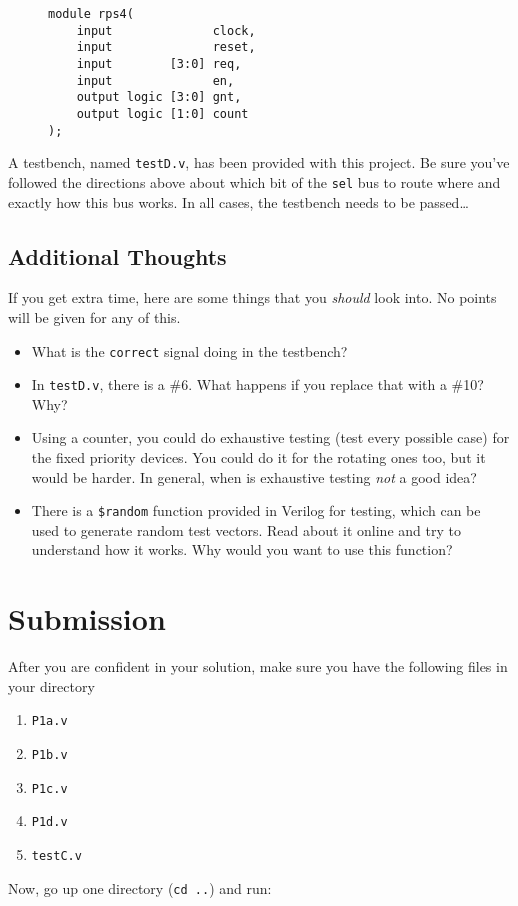 \documentclass{article}
\begin{document}
\begin{figure}[H]
\begin{verbatim}
module rps4(
	input              clock,
	input              reset,
	input        [3:0] req,
	input              en,
	output logic [3:0] gnt,
	output logic [1:0] count
);
\end{verbatim}
\end{figure}

A testbench, named \texttt{testD.v}, has been provided with this project. Be
sure you've followed the directions above about which bit of the \texttt{sel}
bus to route where and exactly how this bus works. In all cases, the testbench
needs to be passed\dots

\subsection{Additional Thoughts}
If you get extra time, here are some things that you \emph{should} look into. No
points will be given for any of this.
\begin{itemize}
	\item What is the \texttt{correct} signal doing in the testbench?
	\item In \texttt{testD.v}, there is a \#6. What happens if you replace that with a \#10? Why?
	\item Using a counter, you could do exhaustive testing (test every possible
		case) for the fixed priority devices. You could do it for the rotating
		ones too, but it would be harder. In general, when is exhaustive testing
		\emph{not} a good idea?
	\item There is a \texttt{\$random} function provided in Verilog for testing,
		which can be used to generate random test vectors. Read about it online
		and try to understand how it works. Why would you want to use this
		function?
\end{itemize}
\section{Submission}
After you are confident in your solution, make sure you have the following files
in your directory
\begin{enumerate}
	\item \texttt{P1a.v}
	\item \texttt{P1b.v}
	\item \texttt{P1c.v}
	\item \texttt{P1d.v}
	\item \texttt{testC.v}
\end{enumerate}
Now, go up one directory (\texttt{cd ..}) and run:
\end{document}
